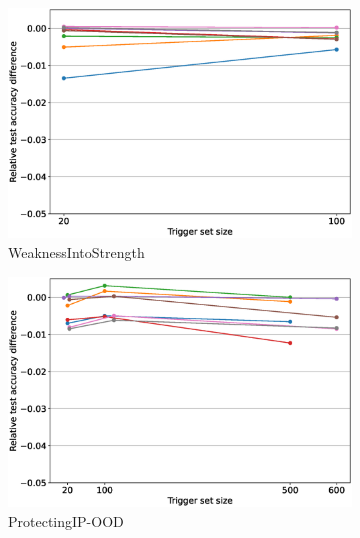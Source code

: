 \begin{figure}
    \centering
    \begin{subfigure}{0.4\linewidth}
        \includegraphics[width=\linewidth]{images/fidelity/WeaknessIntoStrength_fidelity_rel_per_method.eps}
        \caption{WeaknessIntoStrength}
        \label{fig:fidelity-weakness}
    \end{subfigure}
    \quad
    \begin{subfigure}{0.4\linewidth}
        \includegraphics[width=\linewidth]{images/fidelity/ProtectingIP-OOD_fidelity_rel_per_method.eps}
        \caption{ProtectingIP-OOD}
        \label{fig:fidelity-ood}
    \end{subfigure}
    \quad
    \begin{subfigure}{0.4\linewidth}

\end{subfigure}
\end{figure}
